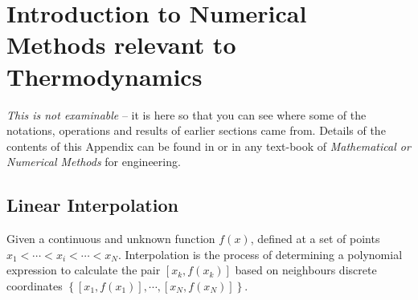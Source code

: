 
\chapter{Introduction to Numerical Methods relevant to Thermodynamics}\label{Appendix_NumMethods}

{\it This is not examinable} -- it is here so that you can see where some of the notations, operations and results of earlier sections came from. Details of the contents of this Appendix can be found in \cite{Atkinson_Book_Newton,Atkinson_Book_Interpolation,NumericalRecipes_Interpolation,NumericalRecipes_Newton} or in any text-book of {\it Mathematical or Numerical Methods} for engineering.

\section{Linear Interpolation}\label{LinearInterpolation}

Given a continuous and unknown function $f(x)$, defined at a set of points  $x_{1} < \cdots < x_{i} < \cdots < x_{N}$. Interpolation is the process of determining a polynomial expression to calculate the pair $\left[x_{k}, f\left(x_{k}\right)\right]$ based on neighbours discrete coordinates $\left\{\left[x_{1},f\left(x_{1}\right)\right], \cdots, \left[x_{N},f\left(x_{N}\right)\right]\right\}$. 

